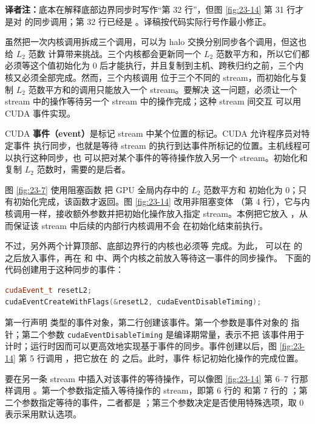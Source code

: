 \noindent\textbf{译者注：}底本在解释底部边界同步时写作“第 32 行”，但图
\ref{fig:23-14} 第 31 行才是对  的同步调用；第 32 行已经是
。译稿按代码实际行号作最小修正。

虽然把一次内核调用拆成三个调用，可以为 halo 交换分别同步各个调用，但这也给 $L_2$ 范数
计算带来挑战。三个内核都会更新同一个 $L_2$ 范数平方和，所以它们都必须等这个值初始化为
0 后才能执行，并且复制到主机、跨秩归约之前，三个内核又必须全部完成。然而，三个内核调用
位于三个不同的 stream，而初始化与复制 $L_2$ 范数平方和的调用只能放入一个 stream。要解决
这一问题，必须让一个 stream 中的操作等待另一个 stream 中的操作完成；这种 stream 间交互
可以用 CUDA 事件实现。

CUDA \textbf{事件（event）}是标记 stream 中某个位置的标记。CUDA 允许程序员对特定事件
执行同步，也就是等待 stream 的执行到达事件所标记的位置。主机线程可以执行这种同步，也
可以把对某个事件的等待操作放入另一个 stream。初始化和复制 $L_2$ 范数时，需要的是后者。

图 \ref{fig:23-7} 使用阻塞函数  把 GPU 全局内存中的 $L_2$ 范数平方和
初始化为 0；只有初始化完成，该函数才返回。图 \ref{fig:23-14} 改用非阻塞变体
（第 4 行），它与内核调用一样，接收额外参数并把初始化操作放入指定
stream。本例把它放入 ，从而保证该 stream 中后续的内部行内核调用不会
在初始化结束前执行。

不过，另外两个计算顶部、底部边界行的内核也必须等  完成。为此，
可以在  的  之后放入事件，再在
 和  中、两个内核之前放入等待这一事件的同步操作。
下面的代码创建用于这种同步的事件：

\begin{lstlisting}[language=C++,numbers=none]
cudaEvent_t resetL2;
cudaEventCreateWithFlags(&resetL2, cudaEventDisableTiming);
\end{lstlisting}

第一行声明  类型的事件对象，第二行创建该事件。第一个参数是事件对象的
指针；第二个参数
\texttt{cudaEventDisable\allowbreak Timing} 是编译期常量，表示不把
该事件用于计时；运行时因而可以更高效地实现基于事件的同步。事件创建以后，图
\ref{fig:23-14} 第 5 行调用 ，把它放在  的
 之后。此时，事件  标记初始化操作的完成位置。

要在另一条 stream 中插入对该事件的等待操作，可以像图 \ref{fig:23-14} 第 6--7 行那样调用
。第一个参数指定插入等待操作的 stream，即第 6 行的
 和第 7 行的 ；第二个参数指定等待的事件，二者都是
；第三个参数决定是否使用特殊选项，取 0 表示采用默认选项。

